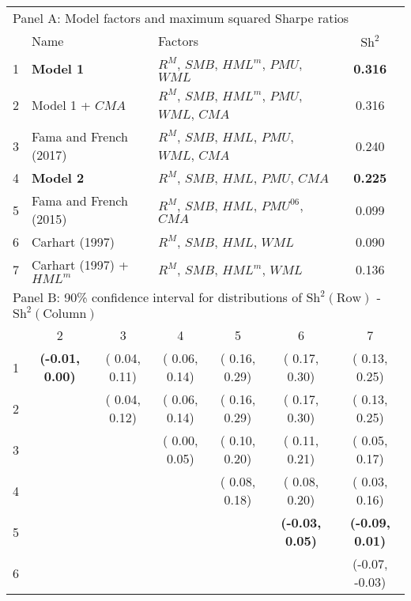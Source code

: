 
\begin{tabular}{lcccccc}
  \toprule
  \multicolumn{7}{l}{Panel A: Model factors and maximum squared Sharpe ratios} \\
        & \multicolumn{2}{l}{Name}                         & \multicolumn{3}{l}{Factors}                                    & $\text{Sh}^2$   \\
  1     & \multicolumn{2}{l}{\textbf{Model 1}}             & \multicolumn{3}{l}{$R^M$, $SMB$, $HML^m$, $PMU$, $WML$}        & \textbf{0.316} \\
  2     & \multicolumn{2}{l}{Model 1 + $CMA$}              & \multicolumn{3}{l}{$R^M$, $SMB$, $HML^m$, $PMU$, $WML$, $CMA$} & 0.316 \\
  3     & \multicolumn{2}{l}{Fama and French (2017)}       & \multicolumn{3}{l}{$R^M$, $SMB$, $HML$, $PMU$, $WML$, $CMA$}   & 0.240 \\
  4     & \multicolumn{2}{l}{\textbf{Model 2}}             & \multicolumn{3}{l}{$R^M$, $SMB$, $HML$, $PMU$, $CMA$}          & \textbf{0.225} \\
  5     & \multicolumn{2}{l}{Fama and French (2015)}       & \multicolumn{3}{l}{$R^M$, $SMB$, $HML$, $PMU^{06}$, $CMA$}     & 0.099 \\
  6     & \multicolumn{2}{l}{Carhart (1997)}               & \multicolumn{3}{l}{$R^M$, $SMB$, $HML$, $WML$}                 & 0.090 \\
  7     & \multicolumn{2}{l}{Carhart (1997) + $HML^m$}     & \multicolumn{3}{l}{$R^M$, $SMB$, $HML^m$, $WML$}               & 0.136 \\
  \midrule
  \multicolumn{7}{l}{Panel B: 90\% confidence interval for distributions of $\text{Sh}^2(\text{Row})$ - $\text{Sh}^2(\text{Column})$} \\
        &        2         &        3         &        4         &        5         &        6         &        7         \\
  1     & \textbf{(-0.01,  0.00)} & ( 0.04,  0.11) & ( 0.06,  0.14) & ( 0.16,  0.29) & ( 0.17,  0.30) & ( 0.13,  0.25) \\
  2     &                  & ( 0.04,  0.12) & ( 0.06,  0.14) & ( 0.16,  0.29) & ( 0.17,  0.30) & ( 0.13,  0.25) \\
  3     &                  &                  & ( 0.00,  0.05) & ( 0.10,  0.20) & ( 0.11,  0.21) & ( 0.05,  0.17) \\
  4     &                  &                  &                  & ( 0.08,  0.18) & ( 0.08,  0.20) & ( 0.03,  0.16) \\
  5     &                  &                  &                  &                  & \textbf{(-0.03,  0.05)} & \textbf{(-0.09,  0.01)} \\
  6     &                  &                  &                  &                  &                  & (-0.07, -0.03) \\
  \bottomrule
\end{tabular}
